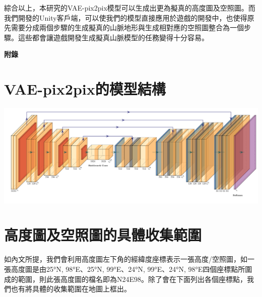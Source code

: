 \documentclass[a4paper, 12pt]{article}
\begin{document}
綜合以上，本研究的VAE-pix2pix模型可以生成出更為擬真的高度圖及空照圖。而我們開發的Unity客戶端，可以使我們的模型直接應用於遊戲的開發中，也使得原先需要分成兩個步驟的生成擬真的山脈地形與生成相對應的空照圖整合為一個步驟。這些都會讓遊戲開發生成擬真山脈模型的任務變得十分容易。

\nocite{*}
\printbibliography[title={參考文獻}]



\newpage
\begin{appendices}
    \setcounter{page}{1}
    \textbf{\LARGE 附錄}

    \section{VAE-pix2pix的模型結構}
    \begin{center}
        \includegraphics[width=\textwidth]{fig/Unet.pdf}
    \end{center}

    \section{高度圖及空照圖的具體收集範圍}
    如內文所提，我們會利用高度圖左下角的經緯度座標表示一張高度/空照圖，如一張高度圖是由25°N, 98°E、25°N, 99°E、24°N, 99°E、24°N, 98°E四個座標點所圍成的範圍，則此張高度圖的檔名即為N24E98。除了會在下面列出各個座標點，我們也有將具體的收集範圍在地圖上框出。


\end{appendices}
\end{document}
